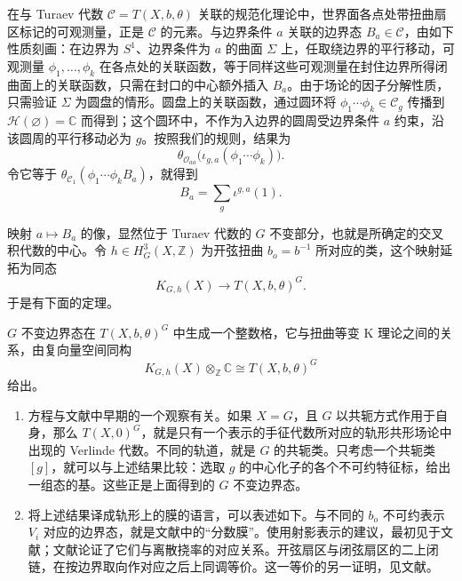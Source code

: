 在与 Turaev 代数 $\mathcal{C}=T(X,b,\theta)$ 关联的规范化理论中，世界面各点处带扭曲扇区标记的可观测量，正是 $\mathcal{C}$ 的元素。与边界条件 $a$ 关联的边界态 $B_a\in\mathcal{C}$，由如下性质刻画：在边界为 $S^1$、边界条件为 $a$ 的曲面 $\Sigma$ 上，任取绕边界的平行移动，可观测量 $\phi_1,\ldots,\phi_k$ 在各点处的关联函数，等于同样这些可观测量在封住边界所得闭曲面上的关联函数，只需在封口的中心额外插入 $B_a$。由于场论的因子分解性质，只需验证 $\Sigma$ 为圆盘的情形。圆盘上的关联函数，通过圆环将 $\phi_1\cdots\phi_k\in\mathcal{C}_g$ 传播到 $\mathcal{H}(\varnothing)=\mathbb{C}$ 而得到；这个圆环中，不作为入边界的圆周受边界条件 $a$ 约束，沿该圆周的平行移动必为 $g$。按照我们的规则，结果为
\[
\theta_{\mathcal{O}_{aa}}\bigl(\iota_{g,a}(\phi_1\cdots\phi_k)\bigr).
\]
令它等于 $\theta_{\mathcal{C}_1}(\phi_1\cdots\phi_kB_a)$，就得到
\[
B_a=\sum_g\iota^{g,a}(1).
\]

映射 $a\mapsto B_a$ 的像，显然位于 Turaev 代数的 $G$ 不变部分，也就是所确定的交叉积代数的中心。令 $h\in H_G^3(X,\mathbb{Z})$ 为开弦扭曲 $b_o=b^{-1}$ 所对应的类，这个映射延拓为同态
\[
K_{G,h}(X)\longrightarrow T(X,b,\theta)^G.
\]
于是有下面的定理。

\begin{theorem}\label{thm:2.20}
$G$ 不变边界态在 $T(X,b,\theta)^G$ 中生成一个整数格，它与扭曲等变 K 理论之间的关系，由复向量空间同构
\begin{equation}\label{eq:2.110}
K_{G,h}(X)\otimes_{\mathbb{Z}}\mathbb{C}\cong T(X,b,\theta)^G
\end{equation}
给出。
\end{theorem}

\begin{note}[2.21]\label{note:2.21}
\begin{enumerate}[label=(\arabic*)]
\item 方程与文献中早期的一个观察有关。如果 $X=G$，且 $G$ 以共轭方式作用于自身，那么 $T(X,0)^G$，就是只有一个表示的手征代数所对应的轨形共形场论中出现的 Verlinde 代数。不同的轨道，就是 $G$ 的共轭类。只考虑一个共轭类 $[g]$，就可以与上述结果比较：选取 $g$ 的中心化子的各个不可约特征标，给出一组态的基。这些正是上面得到的 $G$ 不变边界态。
\item 将上述结果译成轨形上的膜的语言，可以表述如下。与不同的 $b_o$ 不可约表示 $V_i$ 对应的边界态，就是文献中的“分数膜”。使用射影表示的建议，最初见于文献；文献论证了它们与离散挠率的对应关系。开弦扇区与闭弦扇区的二上闭链，在按边界取向作对应之后上同调等价。这一等价的另一证明，见文献。
\end{enumerate}
\end{note}

